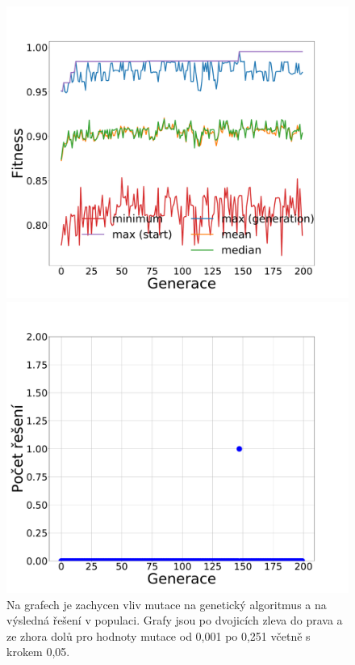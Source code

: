 \documentclass[11pt]{article}
\begin{document}
\begin{landscape}
\begin{figure}
\begin{minipage}[c]{0.35\textwidth}
        \centering \includegraphics[width=\textwidth]{img/m251g.pdf} 
    \end{minipage}
    \begin{minipage}[c]{0.35\textwidth}
        \centering \includegraphics[width=\textwidth]{img/m251s.pdf} 
    \end{minipage}
   \caption{Na grafech je zachycen vliv mutace na genetický algoritmus a na výsledná řešení v populaci. Grafy jsou po dvojicích zleva do prava a ze zhora dolů pro hodnoty mutace od 0,001 po 0,251 včetně s krokem 0,05.}\label{fig:mutAll}
\end{figure} 
\end{landscape} 
\end{document}
